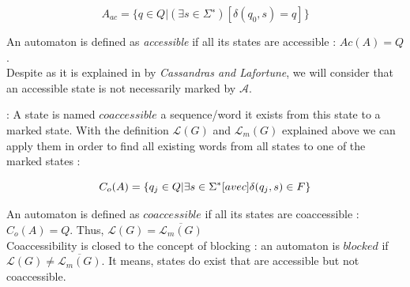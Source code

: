 \begin{equation*}
A_{ac} = \{q \in Q | (\exists s \in \Sigma^∗) [\delta(q_0, s) = q]\}
\end{equation*}

\vspace{0.5cm}

An automaton is defined as \emph{accessible} if all its states are accessible : $Ac(A)=Q$.\\
Despite as it is explained in \cite{cassandras2009introduction} by \textit{Cassandras and Lafortune}, we will consider that an accessible state  is not necessarily marked by $\mathcal{A}$.

\begin{description}
\newpage
\item [Coaccessibility] : A state is named $coaccessible$ a sequence/word it exists from this state to a marked state. With the definition $\mathcal{L}(G)$ and $\mathcal{L}_m(G)$ explained above we can apply them in order to find all existing words from all states to one of the marked states :
\end{description}

\begin{equation*}
C_o(A) = \{q_j \in Q| \exists s \in \Sigma^* \text[avec] \delta(q_j, s) \in F\}
\end{equation*}
 \vspace{0.5cm}
 
An automaton is defined as $coaccessible$ if all its states are coaccessible : $C_o(A)=Q$. Thus, $\mathcal{L}(G) = \overline{\mathcal{L}_m(G)}$\\
Coaccessibility is closed to the concept of blocking : an automaton is $blocked$ if $\mathcal{L}(G) \neq \overline{\mathcal{L}_m(G)}$. It means, states do exist that are accessible but not coaccessible.

